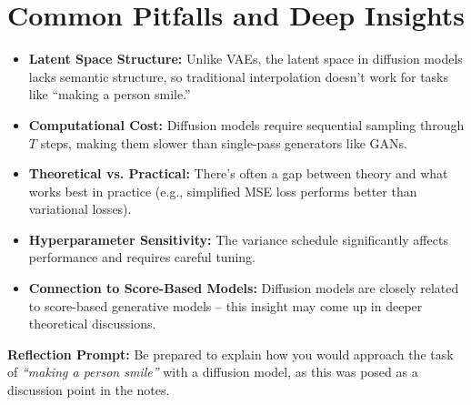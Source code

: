 \section{Common Pitfalls and Deep Insights}

\begin{itemize}
    \item \textbf{Latent Space Structure:} Unlike VAEs, the latent space in diffusion models lacks semantic structure, so traditional interpolation doesn’t work for tasks like “making a person smile.”

    \item \textbf{Computational Cost:} Diffusion models require sequential sampling through $T$ steps, making them slower than single-pass generators like GANs.

    \item \textbf{Theoretical vs. Practical:} There’s often a gap between theory and what works best in practice (e.g., simplified MSE loss performs better than variational losses).

    \item \textbf{Hyperparameter Sensitivity:} The variance schedule significantly affects performance and requires careful tuning.

    \item \textbf{Connection to Score-Based Models:} Diffusion models are closely related to score-based generative models – this insight may come up in deeper theoretical discussions.
\end{itemize}

\textbf{Reflection Prompt:} Be prepared to explain how you would approach the task of \textit{“making a person smile”} with a diffusion model, as this was posed as a discussion point in the notes.

